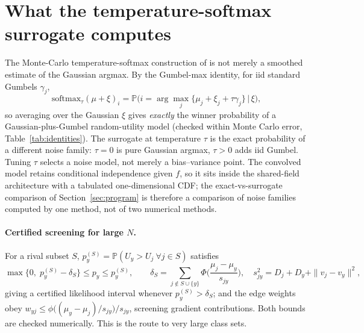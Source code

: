 \documentclass[11pt]{article}
\theoremstyle{remark}
\newcommand{\Prob}{\mathbb{P}}
\begin{document}
\section{What the temperature-softmax surrogate computes}
\label{sec:surrogate}

The Monte-Carlo temperature-softmax construction of
\citet{collier2021} is not merely a smoothed estimate of the Gaussian
argmax. By the Gumbel-max identity, for iid standard Gumbels
$\gamma_j$,
\[
\mathrm{softmax}_\tau(\mu + \xi)_i
= \Prob\big(i = \arg\max_j \{\mu_j + \xi_j + \tau \gamma_j\} \,\big|\,
\xi\big),
\]
so averaging over the Gaussian $\xi$ gives \emph{exactly} the winner
probability of a Gaussian-plus-Gumbel random-utility model
(checked within Monte Carlo error, Table~\ref{tab:identities}). The
surrogate at temperature $\tau$ is the exact probability of a different
noise family: $\tau = 0$ is pure Gaussian argmax, $\tau > 0$ adds iid
Gumbel. Tuning $\tau$ selects a noise model, not merely a
bias--variance point. The convolved model retains conditional
independence given $f$, so it sits inside the shared-field architecture
with a tabulated one-dimensional CDF; the exact-vs-surrogate comparison
of Section~\ref{sec:program} is therefore a comparison of noise
families computed by one method, not of two numerical methods.

\paragraph{Certified screening for large $N$.} For a rival subset $S$,
$p_y^{(S)} = \Prob(U_y > U_j\ \forall j \in S)$ satisfies
\[
\max\{0,\; p_y^{(S)} - \delta_S\} \le p_y \le p_y^{(S)}, \qquad
\delta_S = \sum_{j \notin S \cup \{y\}} \Phi\Big( \frac{\mu_j -
\mu_y}{s_{jy}} \Big), \quad s_{jy}^2 = D_j + D_y + \|v_j - v_y\|^2,
\]
giving a certified likelihood interval whenever $p_y^{(S)} > \delta_S$;
and the edge weights obey $w_{yj} \le \phi\big((\mu_y -
\mu_j)/s_{jy}\big)/s_{jy}$, screening gradient contributions. Both
bounds are checked numerically. This is the route to very large class
sets.
\end{document}
